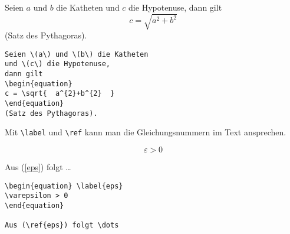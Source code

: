 \exa
Seien \(a\) und \(b\) die Katheten
und \(c\) die Hypotenuse,
dann gilt
\begin{equation}
c = \sqrt{  a^{2}+b^{2}  }
\end{equation}
(Satz des Pythagoras).
\exb
\begin{verbatim}
Seien \(a\) und \(b\) die Katheten
und \(c\) die Hypotenuse,
dann gilt
\begin{equation}
c = \sqrt{  a^{2}+b^{2}  }
\end{equation}
(Satz des Pythagoras).
\end{verbatim}
\exc

Mit \lstinline|\label| und \lstinline|\ref| kann man die Gleichungsnummern
im Text ansprechen.

\exa
\begin{equation} \label{eps}
\varepsilon > 0
\end{equation}
 
Aus (\ref{eps}) folgt \dots
\exb
\begin{verbatim}
\begin{equation} \label{eps}
\varepsilon > 0
\end{equation}
 
Aus (\ref{eps}) folgt \dots
\end{verbatim}
\exc
 
 
 
